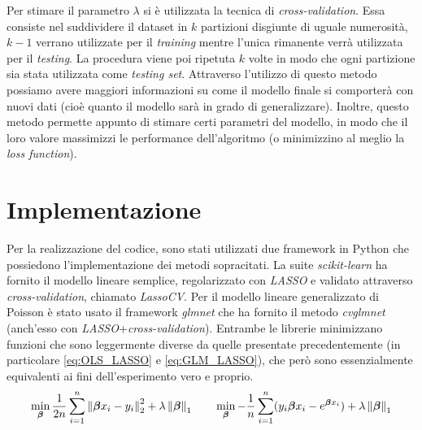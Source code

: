 Per stimare il parametro $\lambda$ si è utilizzata la tecnica di \textit{cross-validation}. Essa consiste nel suddividere il 
dataset in $k$ partizioni disgiunte di uguale numerosità, $k-1$ verrano utilizzate per il \textit{training} mentre l'unica 
rimanente verrà utilizzata per il \textit{testing}. La procedura viene poi ripetuta $k$ volte in modo che ogni partizione 
sia stata utilizzata come \textit{testing set}. Attraverso l'utilizzo di questo metodo possiamo avere maggiori 
informazioni su come il modello finale si comporterà con nuovi dati (cioè quanto il modello sarà in grado di generalizzare). 
Inoltre, questo metodo permette appunto di stimare certi parametri del modello, in modo che il loro valore massimizzi le 
performance dell'algoritmo (o minimizzino al meglio la \textit{loss function}).   

\section{Implementazione}
\bigskip

Per la realizzazione del codice, sono stati utilizzati due framework in Python che possiedono l'implementazione dei metodi
sopracitati. La suite \textit{scikit-learn} \cite{scikit-learn} ha fornito il modello lineare semplice, regolarizzato con 
\textit{LASSO} e validato attraverso \textit{cross-validation}, chiamato \textit{LassoCV}. Per il modello lineare 
generalizzato di Poisson è stato usato il framework \textit{glmnet} \cite{GLMNET} che ha fornito il metodo \textit{cvglmnet} 
(anch'esso con \textit{LASSO}+\textit{cross-validation}). Entrambe le librerie minimizzano funzioni che sono 
leggermente diverse da quelle presentate precedentemente (in particolare \eqref{eq:OLS_LASSO} e \eqref{eq:GLM_LASSO}), che 
però sono essenzialmente equivalenti ai fini dell'esperimento vero e proprio. 
\begin{gather}
	\min_{\bm{\beta}} \frac{1}{2n}\sum_{i=1}^n \left\lVert\bm{\beta} x_i -y_i\right\rVert_{2}^2 + \lambda\left\lVert\bm{\beta}\right\rVert_1 	\qquad
	\min_{\bm{\beta}} -\frac{1}{n}\sum_{i=1}^n (y_i\bm{\beta} x_i - e^{\bm{\beta} x_i} ) + \lambda\left\lVert\bm{\beta}\right\rVert_1
\end{gather}

\newpage